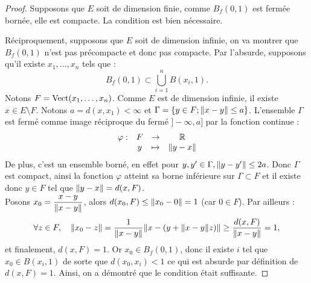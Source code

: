 \begin{proof}
Supposons que $E$ soit de dimension finie, comme $B_f(0,1)$ est fermée bornée, elle est compacte. La condition est bien nécessaire.

Réciproquement, supposons que $E$ soit de dimension infinie, 
on va montrer que $B_f(0,1)$ n'est pas précompacte et donc pas compacte. 
Par l'absurde, supposons qu'il existe $x_1, \dots, x_n$ tels que :
\[ B_f(0,1) \subset \bigcup_{i=1}^n B(x_i,1) . \]
Notons $F=\operatorname{Vect}(x_1,\dots,x_n)$. Comme $E$ est de dimension infinie, il existe $x \in E \setminus F$.
Notons $a= d(x,x_1) < \infty$ et $\Gamma = \{ y \in F ; \lVert x-y\rVert \leq a \}$. 
L'ensemble $\Gamma$ est fermé comme image réciproque du fermé $]-\infty, a]$ par la fonction continue :
\[ \begin{array}{c c c c}
\varphi : & F & \to & \mathbb{R} \\
& y & \mapsto & \lVert y-x\rVert
\end{array} \]
De plus, c'est un ensemble borné, en effet pour $y, y' \in \Gamma, \lVert y-y'\rVert \leq 2a$.
Donc $\Gamma$ est compact, ainsi la fonction $\varphi$ atteint sa borne inférieure sur $\Gamma \subset F$ et il existe donc 
$y \in F$ tel que $\lVert y-x\rVert = d(x,F)$. \\
Posons $x_0 = \dfrac{x-y}{\lVert x-y\rVert}$, alors $d(x_0, F) \leq \lVert x_0-0\rVert = 1$ (car $0 \in F$). Par ailleurs :
\[ \forall z \in F, \quad \lVert x_0-z\rVert= \dfrac1{\lVert x-y\rVert} \lVert x-(y+\lVert x-y\rVert z)\rVert \geq \dfrac{d(x,F)}{\lVert x-y\rVert} = 1, \]
et finalement, $d(x,F)=1$.
Or $x_0 \in B_f(0,1)$, donc il existe $i$ tel que $x_0 \in B(x_i, 1)$ de sorte que $d(x_0,x_i) < 1$ ce qui est absurde par définition de
$d(x,F)=1$. Ainsi, on a démontré que le condition était suffisante.

\end{proof}

